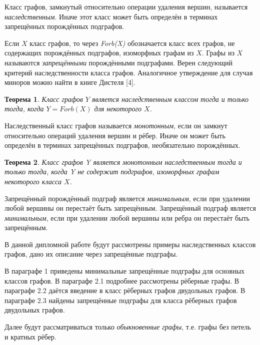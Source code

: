 \documentclass[12pt]{article}
\newtheorem{theorem}{\hspace{1cm}Теорема}
\begin{document}
Класс графов, замкнутый относительно операции удаления вершин, называется {\it наследственным}. Иначе этот класс может быть определён в терминах запрещённых порождённых подграфов.

Если $X$ класс графов, то через {\it Forb(X)} обозначается класс всех графов, не содержащих порождённых подграфов, изоморфных графам из $X$. Графы из $X$ называются {\it запрещёнными} порождёнными подграфами. Верен следующий критерий наследственности класса графов. Аналогичное утверждение для случая  миноров можно найти в книге Дистеля [4].

\begin{theorem}
\label{t1}
Класс графов $Y$ является наследственным классом тогда и только тогда, когда $Y = Forb(X)$ для некоторого $X$.
\end{theorem} 
\vspace{-3mm}

Наследственный класс графов называется {\it монотонным}, если он замкнут относительно операций удаления вершин и рёбер. Иначе он может быть определён в терминах запрещённых подграфов, необязательно порождённых.

\vspace{-3mm}
\begin{theorem}
\label{t2}	
	Класс графов Y является монотонным наследственным тогда и только тогда, когда Y не содержит подграфов, изоморфных графам некоторого класса $X$.
\end{theorem}
\vspace{-3mm}

Запрещённый порождённый подграф является {\it минимальным}, если при удалении любой вершины он перестаёт быть запрещённым.
Запрещённый подграф является {\it минимальным}, если при удалении любой вершины или ребра он перестаёт быть запрещённым.

В данной дипломной работе будут рассмотрены примеры наследственных классов графов, дано их описание через запрещённые подграфы. 

В параграфе 1 приведены минимальные запрещённые подграфы для основных классов графов. В параграфе 2.1 подробнее рассмотрены рёберные графы. В параграфе 2.2 даётся введение в класс рёберных графов двудольных графов. В параграфе 2.3  найдены запрещённые подграфы для класса рёберных графов двудольных графов.

Далее будут рассматриваться только {\it обыкновенные графы}, т.е. графы без петель и кратных рёбер.
\newpage
\end{document}
